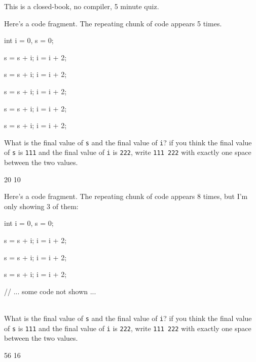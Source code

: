 

This is a closed-book, no compiler, 5 minute quiz.

\nextq
Here's a code fragment.
The repeating chunk of code appears 5 times.
\begin{console}[commandchars=\@\{\},fontsize=\footnotesize]
int i = 0, s = 0;

s = s + i;
i = i + 2;

s = s + i;
i = i + 2;

s = s + i;
i = i + 2;

s = s + i;
i = i + 2;

s = s + i;
i = i + 2;
\end{console}
What is the final value of \verb!s!
and the final value of \verb!i!?
if you think the final value of \verb!s! is \verb!111!
and the final value of \verb!i! is \verb!222!, write
\verb!111 222! with exactly one space between the two values.
\\
\ANSWER
\begin{answercode}
20 10
\end{answercode}

\nextq
Here's a code fragment.
The repeating chunk of code appears 8 times, but I'm only showing 3 of them:
\begin{console}[frame=single,commandchars=\@\{\},fontsize=\footnotesize]
int i = 0, s = 0;

s = s + i;
i = i + 2;

s = s + i;
i = i + 2;

s = s + i;
i = i + 2;

// ... some code not shown ...
\end{console}
\\
What is the final value of \verb!s!
and the final value of \verb!i!?
if you think the final value of \verb!s! is \verb!111!
and the final value of \verb!i! is \verb!222!, write
\verb!111 222! with exactly one space between the two values.
\\
\ANSWER
\begin{answercode}
56 16
\end{answercode}

